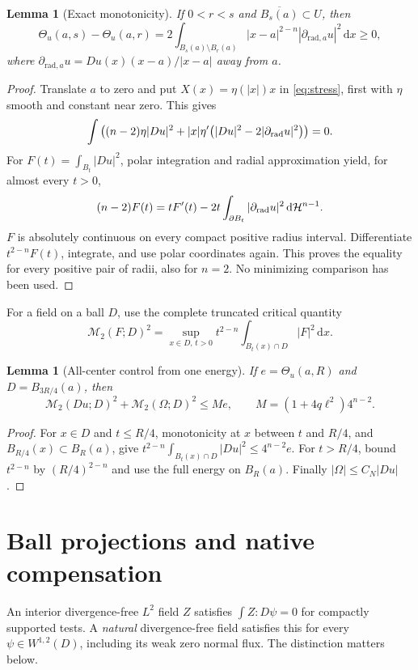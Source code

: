 \documentclass[11pt,a4paper]{article}
\numberwithin{equation}{section}
\newtheorem{lemma}[theorem]{Lemma}
\theoremstyle{definition}
\theoremstyle{remark}
\newcommand{\dd}{\,\mathrm d}
\newcommand{\dx}{\dd x}
\newcommand{\M}{\mathcal M}
\newcommand{\Th}{\Theta}
\newcommand{\cl}[1]{\overline{#1}}
\begin{document}
\begin{lemma}[Exact monotonicity]\label{lem:monotonicity}
If $0<r<s$ and $\cl{B_s(a)}\subset U$, then
\begin{equation}\label{eq:monotonicity}
 \Th_u(a,s)-\Th_u(a,r)
 =2\int_{B_s(a)\setminus B_r(a)}
 |x-a|^{2-n}|\partial_{\mathrm{rad},a}u|^2\dx\geq0,
\end{equation}
where $\partial_{\mathrm{rad},a}u=Du(x)(x-a)/|x-a|$ away from $a$.
\end{lemma}
\begin{proof}
Translate $a$ to zero and put $X(x)=\eta(|x|)x$ in \eqref{eq:stress},
first with $\eta$ smooth and constant near zero. This gives
\[
 \int\left((n-2)\eta|Du|^2
 +|x|\eta'\bigl(|Du|^2-2|\partial_{\rm rad}u|^2\bigr)\right)=0.
\]
For $F(t)=\int_{B_t}|Du|^2$, polar integration and radial approximation
yield, for almost every $t>0$,
\[
 (n-2)F(t)=tF'(t)-2t\int_{\partial B_t}|\partial_{\rm rad}u|^2
                                      \dd\mathcal H^{n-1}.
\]
$F$ is absolutely continuous on every compact positive radius interval.
Differentiate $t^{2-n}F(t)$, integrate, and use polar coordinates again.
This proves the equality for every positive pair of radii, also for
$n=2$. No minimizing comparison has been used.
\end{proof}

For a field on a ball $D$, use the complete truncated critical quantity
\begin{equation}\label{eq:morrey}
 \M_2(F;D)^2=
 \sup_{x\in D,\,t>0}t^{2-n}\int_{B_t(x)\cap D}|F|^2\dx.
\end{equation}
\begin{lemma}[All-center control from one energy]\label{lem:local-morrey}
If $e=\Th_u(a,R)$ and $D=B_{3R/4}(a)$, then
\begin{equation}\label{eq:joint-smallness}
 \M_2(Du;D)^2+\M_2(\Omega;D)^2\leq M e,\qquad
 M=(1+4q\ell^2)4^{n-2}.
\end{equation}
\end{lemma}
\begin{proof}
For $x\in D$ and $t\leq R/4$, monotonicity at $x$ between $t$ and
$R/4$, and $B_{R/4}(x)\subset B_R(a)$, give
$t^{2-n}\int_{B_t(x)\cap D}|Du|^2\leq4^{n-2}e$.
For $t>R/4$, bound $t^{2-n}$ by $(R/4)^{2-n}$ and use the full
energy on $B_R(a)$. Finally $|\Omega|\leq C_N|Du|$.
\end{proof}

\section{Ball projections and native compensation}\label{sec:analysis}
An interior divergence-free $L^2$ field $Z$ satisfies
$\int Z:D\psi=0$ for compactly supported tests. A \emph{natural}
divergence-free field satisfies this for every $\psi\in W^{1,2}(D)$,
including its weak zero normal flux. The distinction matters below.
\end{document}
